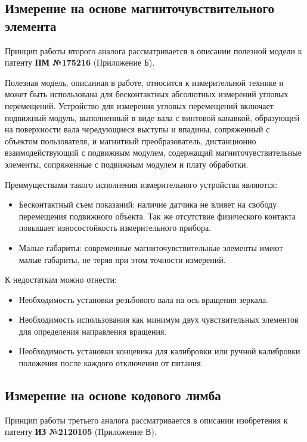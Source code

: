 \subsection{Измерение на основе магниточувствительного элемента}

Принцип работы второго аналога рассматривается в описании полезной модели к патенту \textbf{ПМ №175216} (Приложение Б).

Полезная модель, описанная в работе, относится к измерительной технике и может быть использована для бесконтактных абсолютных измерений угловых перемещений.
Устройство для измерения угловых перемещений включает подвижный модуль, выполненный в виде вала с винтовой канавкой, образующей на поверхности вала чередующиеся выступы и впадины, сопряженный с объектом пользователя, и магнитный преобразователь, дистанционно взаимодействующий с подвижным модулем, содержащий магниточувствительные элементы, сопряженные с подвижным модулем и плату обработки.

Преимуществами такого исполнения измерительного устройства являются:
\begin{itemize}
    \item Бесконтактный съем показаний: наличие датчика не влияет на свободу перемещения подвижного объекта.
            Так же отсутствие физического контакта повышает износостойкость измерительного прибора.
    \item Малые габариты: современные магниточувствительные элементы имеют малые габариты, не теряя при этом точности измерений.
\end{itemize}

К недостаткам можно отнести:
\begin{itemize}
    \item Необходимость установки резьбового вала на ось вращения зеркала.
    \item Необходимость использования как минимум двух чувствительных элементов для определения направления вращения.
    \item Необходимость установки концевика для калибровки или ручной калибровки положения после каждого отключения от питания.
\end{itemize}

\subsection{Измерение на основе кодового лимба}
Принцип работы третьего аналога рассматривается в описании изобретения к патенту \textbf{ИЗ №2120105} (Приложение В).

